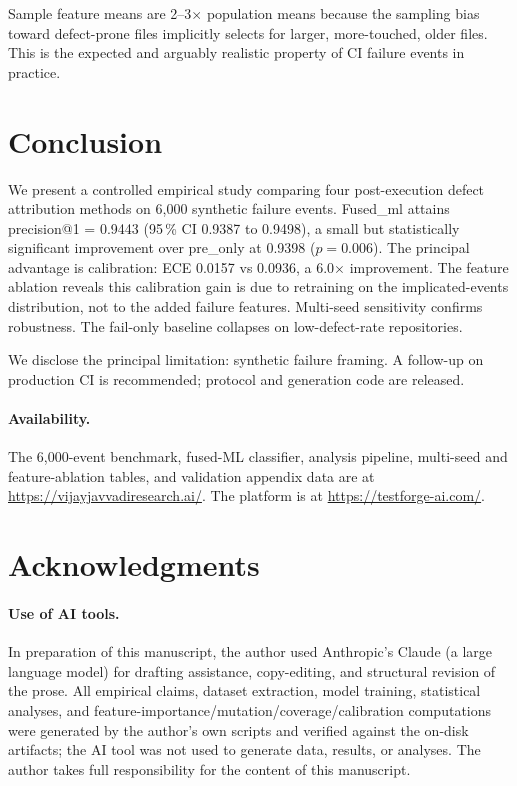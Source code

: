 \documentclass[10pt,twocolumn,letterpaper]{article}
\begin{document}
Sample feature means are 2--3$\times$ population means because the
sampling bias toward defect-prone files implicitly selects for
larger, more-touched, older files. This is the expected and
arguably realistic property of CI failure events in practice.

\section{Conclusion}
\label{sec:conclusion}

We present a controlled empirical study comparing four
post-execution defect attribution methods on 6{,}000 synthetic
failure events. Fused\_ml attains precision@1 = 0.9443 (95\,\% CI
0.9387 to 0.9498), a small but statistically significant
improvement over pre\_only at 0.9398 ($p = 0.006$). The principal
advantage is calibration: ECE 0.0157 vs 0.0936, a 6.0$\times$
improvement. The feature ablation reveals this calibration gain is
due to retraining on the implicated-events distribution, not to the
added failure features. Multi-seed sensitivity confirms robustness.
The fail-only baseline collapses on low-defect-rate repositories.

We disclose the principal limitation: synthetic failure framing.
A follow-up on production CI is recommended; protocol and
generation code are released.

\paragraph{Availability.} The 6{,}000-event benchmark, fused-ML
classifier, analysis pipeline, multi-seed and feature-ablation
tables, and validation appendix data are at
\url{https://vijayjavvadiresearch.ai/}. The platform is at
\url{https://testforge-ai.com/}.



\section*{Acknowledgments}
\paragraph{Use of AI tools.} In preparation of this manuscript, the
author used Anthropic's Claude (a large language model) for drafting
assistance, copy-editing, and structural revision of the prose. All
empirical claims, dataset extraction, model training, statistical
analyses, and feature-importance/mutation/coverage/calibration computations
were generated by the author's own scripts and verified against the
on-disk artifacts; the AI tool was not used to generate data, results,
or analyses. The author takes full responsibility for the content of
this manuscript.



\end{document}
